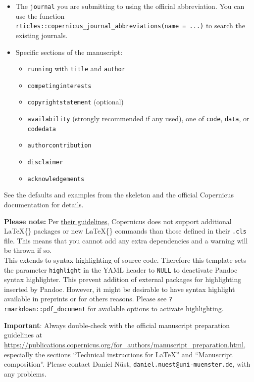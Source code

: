 \documentclass[gc, manuscript]{copernicus}
\begin{document}
\begin{itemize}
\item
  The \texttt{journal} you are submitting to using the official
  abbreviation. You can use the function
  \texttt{rticles::copernicus\_journal\_abbreviations(name\ =\ \textquotesingle{}...\textquotesingle{})}
  to search the existing journals.
\item
  Specific sections of the manuscript:

  \begin{itemize}
  \item
    \texttt{running} with \texttt{title} and \texttt{author}
  \item
    \texttt{competinginterests}
  \item
    \texttt{copyrightstatement} (optional)
  \item
    \texttt{availability} (strongly recommended if any used), one of
    \texttt{code}, \texttt{data}, or \texttt{codedata}
  \item
    \texttt{authorcontribution}
  \item
    \texttt{disclaimer}
  \item
    \texttt{acknowledgements}
  \end{itemize}
\end{itemize}

See the defaults and examples from the skeleton and the official
Copernicus documentation for details.

\textbf{Please note:} Per
\href{https://publications.copernicus.org/for_authors/manuscript_preparation.html}{their
guidelines}, Copernicus does not support additional \LaTeX\{\} packages
or new \LaTeX\{\} commands than those defined in their \texttt{.cls}
file. This means that you cannot add any extra dependencies and a
warning will be thrown if so.\\
This extends to syntax highlighting of source code. Therefore this
template sets the parameter \texttt{highlight} in the YAML header to
\texttt{NULL} to deactivate Pandoc syntax highlighter. This prevent
addition of external packages for highlighting inserted by Pandoc.
However, it might be desirable to have syntax highlight available in
preprints or for others reasons. Please see
\texttt{?rmarkdown::pdf\_document} for available options to activate
highlighting.

\textbf{Important}: Always double-check with the official manuscript
preparation guidelines at
\url{https://publications.copernicus.org/for_authors/manuscript_preparation.html},
especially the sections ``Technical instructions for LaTeX'' and
``Manuscript composition''. Please contact Daniel Nüst,
\texttt{daniel.nuest@uni-muenster.de}, with any problems.
\end{document}

